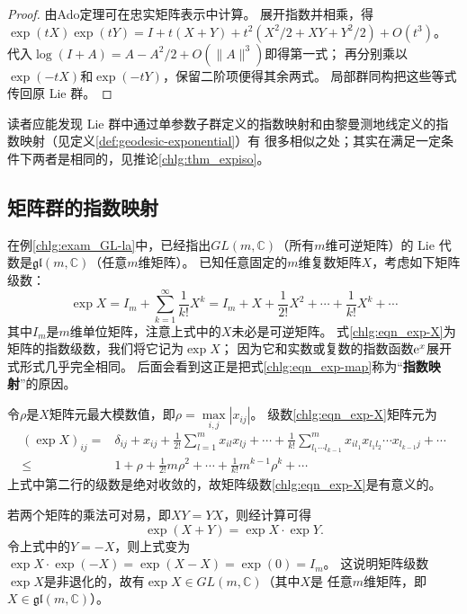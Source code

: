 \begin{proof}
由Ado定理可在忠实矩阵表示中计算。
展开指数并相乘，得
$\exp(tX)\exp(tY)=I+t(X+Y)+t^2(X^2/2+XY+Y^2/2)+O(t^3)$。
代入$\log(I+A)=A-A^2/2+O(\|A\|^3)$即得第一式；
再分别乘以$\exp(-tX)$和$\exp(-tY)$，保留二阶项便得其余两式。
局部群同构把这些等式传回原 Lie 群。
\end{proof}

读者应能发现 Lie 群中通过单参数子群定义的指数映射和由黎曼测地线定义的指数映射（见定义\ref{def:geodesic-exponential}）有
很多相似之处；其实在满足一定条件下两者是相同的，见推论\ref{chlg:thm_expiso}。

\subsection{矩阵群的指数映射}\label{chlg:sec_GL-exp}

在例\ref{chlg:exam_GL-la}中，已经指出$GL(m,\mathbb{C})$（所有$m$维可逆矩阵）的
 Lie 代数是$\mathfrak{gl}(m,\mathbb{C})$（任意$m$维矩阵）。
已知任意固定的$m$维复数矩阵$X$，考虑如下矩阵级数：
\begin{equation}\label{chlg:eqn_exp-X}
    \exp X = I_m+\sum_{k=1}^{\infty} \frac{1}{k!}X^k = I_m + X + \frac{1}{2!} X^2 + \cdots +\frac{1}{k!} X^k + \cdots
\end{equation}
其中$I_m$是$m$维单位矩阵，注意上式中的$X$未必是可逆矩阵。
式\eqref{chlg:eqn_exp-X}为矩阵的指数级数，我们将它记为$\exp X$；
因为它和实数或复数的指数函数$\mathrm{e}^x$展开式形式几乎完全相同。
后面会看到这正是把式\eqref{chlg:eqn_exp-map}称为“\textbf{指数映射}”的原因。

令$\rho$是$X$矩阵元最大模数值，即$\rho= \max\limits_{i,j} |x_{ij}|$。
级数\eqref{chlg:eqn_exp-X}矩阵元为
\begin{align*}
    (\exp X )_{ij} =& \delta_{ij} + x_{ij} + \frac{1}{2!} \sum_{l=1}^{m} x_{il} x_{lj}
     + \cdots + \frac{1}{k!} \sum_{l_1\cdots l_{k-1}}^{m} x_{il_1} x_{l_1 l_2} \cdots x_{l_{k-1} j}
     + \cdots \\
    \leqslant & 1 +\rho +  \frac{1}{2!} m \rho ^2+\cdots + \frac{1}{k!} m^{k-1} \rho^k + \cdots
\end{align*}
上式中第二行的级数是绝对收敛的，故矩阵级数\eqref{chlg:eqn_exp-X}是有意义的。

若两个矩阵的乘法可对易，即$XY=YX$，则经计算可得
\begin{equation}\label{chlg:eqn_tmp34}
    \exp(X+Y) = \exp X \cdot \exp Y .
\end{equation}
令上式中的$Y=-X$，则上式变为$\exp X \cdot \exp (-X) = \exp(X-X) = \exp (0) = I_m$。
这说明矩阵级数$\exp X$是非退化的，故有$\exp X \in GL(m,\mathbb{C})$（其中$X$是
任意$m$维矩阵，即$X \in \mathfrak{gl}(m,\mathbb{C})$）。

